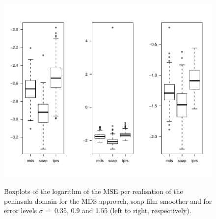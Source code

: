 \begin{figure}
\centering
\includegraphics[width=6in, trim=0in 0.5in 0in 0in]{mds/figs/mds-wt2-boxplot.pdf} \\
\caption{Boxplots of the logarithm of the MSE per realisation of the peninsula domain for the MDS approach, soap film smoother and \tprs for error levels $\sigma=$ 0.35, 0.9 and 1.55 (left to right, respectively).}
\label{mds-wt2-boxplot}
\end{figure}



